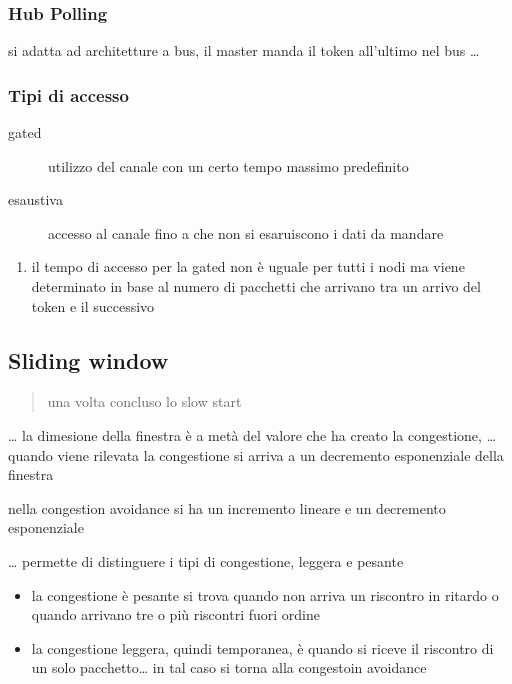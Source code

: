 \documentclass[11pt]{article}
\begin{document}
\subsubsection{Hub Polling}
\label{sec:orge2151f0}
si adatta ad architetture a bus, il master manda il token all'ultimo nel bus \ldots{}

\subsubsection{Tipi di accesso}
\label{sec:org876ff97}
\begin{description}
\item[{gated}] utilizzo del canale con un certo tempo massimo predefinito
\item[{esaustiva}] accesso al canale fino a che non si esaruiscono i dati da mandare
\end{description}

\begin{enumerate}
\item il tempo di accesso per la gated
\label{sec:orgc9ea912}
non è uguale per tutti i nodi ma viene determinato in base al numero di pacchetti che arrivano tra un arrivo del token e il successivo
\end{enumerate}

\subsection{Sliding window}
\label{sec:org0e891da}
\begin{quote}
una volta concluso lo slow start
\end{quote}
\ldots{} la dimesione della finestra è a metà del valore che ha creato la congestione, \ldots{} quando viene rilevata la congestione si arriva a un decremento esponenziale della finestra

nella congestion avoidance si ha un incremento lineare e un decremento esponenziale

\ldots{} permette di distinguere i tipi di congestione, leggera e pesante
\begin{itemize}
\item la congestione è pesante si trova quando non arriva un riscontro in ritardo o quando arrivano tre o più riscontri fuori ordine
\item la congestione leggera, quindi temporanea, è quando si riceve il riscontro di un solo pacchetto\ldots{} in tal caso si torna alla congestoin avoidance
\end{itemize}
\end{document}
